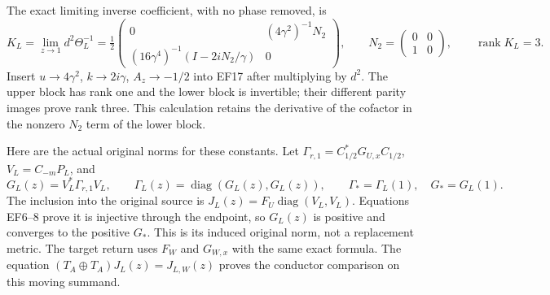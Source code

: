 The exact limiting inverse coefficient, with no phase
removed, is
\begin{equation}
 K_L=\lim_{z\to1}d^2\Theta_L^{-1}
  =\tfrac12\begin{pmatrix}
       0&(4\gamma^2)^{-1}N_2\\
       (16\gamma^4)^{-1}(I-2iN_2/\gamma)&0
     \end{pmatrix},\qquad
 N_2=\begin{pmatrix}0&0\\1&0\end{pmatrix},\qquad\operatorname{rank}K_L=3.
 \tag{EF19}
\end{equation}
Insert $u\to4\gamma^2$, $k\to2i\gamma$,
$A_z\to-1/2$ into EF17 after multiplying by $d^2$.
The upper block has rank one and the lower block is
invertible; their different parity images prove rank three.
This calculation retains the derivative of the cofactor
in the nonzero $N_2$ term of the lower block.

Here are the actual original norms for these constants.
Let $\Gamma_{r,1}=C_{1/2}^*G_{U,x}C_{1/2}$,
$V_L=C_{-m}P_L$, and
\begin{equation}
 G_L(z)=V_L^*\Gamma_{r,1}V_L,\qquad
 \Gamma_L(z)=\operatorname{diag}(G_L(z),G_L(z)),\qquad
 \Gamma_* =\Gamma_L(1),\quad G_*=G_L(1).
 \tag{EF20}
\end{equation}
The inclusion into the original source is
$J_L(z)=F_U\operatorname{diag}(V_L,V_L)$.
Equations EF6--8 prove it is injective through the
endpoint, so $G_L(z)$ is positive and converges to
the positive $G_*$. This is its induced original norm,
not a replacement metric. The target return uses
$F_W$ and $G_{W,x}$ with the same exact formula.
The equation $(T_A\oplus T_A)J_L(z)=J_{L,W}(z)$
proves the conductor comparison on this moving summand.

